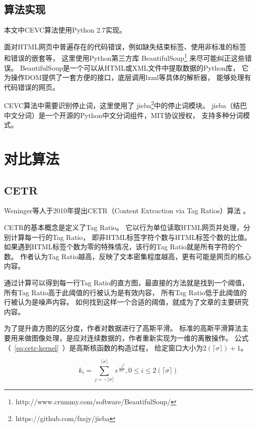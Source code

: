 \subsection{算法实现}
本文中CEVC算法使用Python 2.7实现。

面对HTML网页中普遍存在的代码错误，例如缺失结束标签、使用非标准的标签和错误的嵌套等，
这里使用Python第三方库
BeautifulSoup\footnote{http://www.crummy.com/software/BeautifulSoup/}
来尽可能纠正这些错误。
BeautifulSoup是一个可以从HTML或XML文件中提取数据的Python库，
它为操作DOM提供了一套方便的接口，底层调用lxml等具体的解析器，
能够处理有代码错误的网页。

CEVC算法中需要识别停止词，这里使用了
jieba\footnote{https://github.com/fxsjy/jieba}中的停止词模块。
jieba（结巴中文分词）是一个开源的Python中文分词组件，MIT协议授权，
支持多种分词模式。

\section{对比算法}
\label{sec:cevc-other}

\subsection{CETR}
Weninger等人于2010年提出CETR（Content Extraction via Tag Ratios）算法
。

CETR的基本概念是定义了Tag Ratio。
它以行为单位读取HTML网页并处理，分别计算每一行的Tag Ratio，
即非HTML标签字符个数与HTML标签个数的比值。
如果遇到HTML标签个数为零的特殊情况，该行的Tag Ratio就是所有字符的个数。
作者认为Tag Ratio越高，反映了文本密集程度越高，更有可能是网页的核心内容。

通过计算可以得到每一行Tag Ratio的直方图，最直接的方法就是找到一个阈值，
所有Tag Ratio高于此阈值的行被认为是有效内容，
所有Tag Ratio低于此阈值的行被认为是噪声内容。
如何找到这样一个合适的阈值，就成为了文章的主要研究内容。

为了提升直方图的区分度，作者对数据进行了高斯平滑。
标准的高斯平滑算法主要用来做图像处理，是应对连续数据的，作者重新实现为一维的离散操作。
公式（~\ref{eq:cetr-kernel}~）是高斯核函数的构造过程，
给定窗口大小为$2(\lceil \sigma \rceil) + 1$。

\begin{equation}
\label{eq:cetr-kernel}
k_i = \sum_{j=-\lceil \sigma \rceil}^{\lceil \sigma \rceil}
e^{\frac{-j^2}{2\sigma^2}}, 0 \leq i \leq 2(\lceil \sigma \rceil)
\end{equation}

